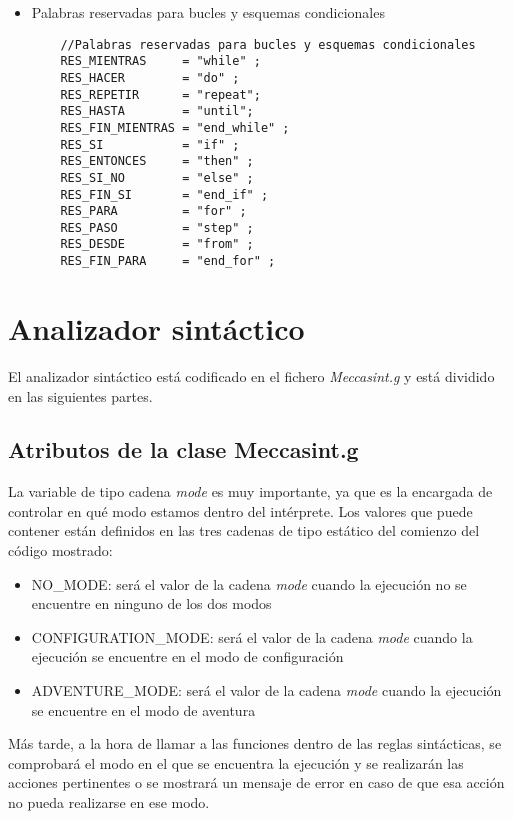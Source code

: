 \documentclass[a4paper,12pt,twoside,openright]{report}
\begin{document}
\begin{itemize}
  \item Palabras reservadas para bucles y esquemas condicionales
  \begin{lstlisting}
    //Palabras reservadas para bucles y esquemas condicionales
    RES_MIENTRAS     = "while" ;
    RES_HACER        = "do" ;
    RES_REPETIR		 = "repeat";
    RES_HASTA        = "until";
    RES_FIN_MIENTRAS = "end_while" ;
    RES_SI           = "if" ;
    RES_ENTONCES     = "then" ;
    RES_SI_NO        = "else" ;
    RES_FIN_SI       = "end_if" ;
    RES_PARA         = "for" ;
    RES_PASO	     = "step" ;
    RES_DESDE        = "from" ;
    RES_FIN_PARA     = "end_for" ;
  \end{lstlisting}


  \end{itemize}

  \section{Analizador sintáctico}
  El analizador sintáctico está codificado en el fichero \emph{Meccasint.g} y está dividido en las siguientes partes.
    \subsection{Atributos de la clase Meccasint.g} %
    
    La variable de tipo cadena \emph{mode} es muy importante, ya que es la encargada de controlar en qué modo estamos 
    dentro del intérprete. Los valores que puede contener están definidos en las tres cadenas de tipo estático del 
    comienzo del código mostrado:
    \begin{itemize}
     \item NO\_MODE: será el valor de la cadena \emph{mode} cuando la ejecución no se encuentre en ninguno de los 
     dos modos
     \item CONFIGURATION\_MODE: será el valor de la cadena \emph{mode} cuando la ejecución se encuentre en el modo de 
     configuración
     \item ADVENTURE\_MODE: será el valor de la cadena \emph{mode} cuando la ejecución se encuentre en el modo de 
     aventura
    \end{itemize}
    Más tarde, a la hora de llamar a las funciones dentro de las reglas sintácticas, se comprobará el modo en el que se encuentra 
    la ejecución y se realizarán las acciones pertinentes o se mostrará un mensaje de error en caso de que esa acción no pueda 
    realizarse en ese modo.
    
\end{document}
